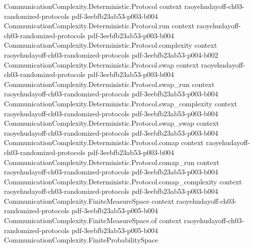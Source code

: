 \begin{theorem}
\label{CommunicationComplexity.Functions.Hash.collision_prob_le}
\leanok
{}
\proofstep
  {CommunicationComplexity.Deterministic.Protocol}
  {context}
  {raoyehudayoff-ch03-randomized-protocols}
  {pdf-3eebfb23ab53-p003-b004}
\proofstep
  {CommunicationComplexity.Deterministic.Protocol.run}
  {context}
  {raoyehudayoff-ch03-randomized-protocols}
  {pdf-3eebfb23ab53-p003-b004}
\proofstep
  {CommunicationComplexity.Deterministic.Protocol.complexity}
  {context}
  {raoyehudayoff-ch03-randomized-protocols}
  {pdf-3eebfb23ab53-p004-b002}
\proofstep
  {CommunicationComplexity.Deterministic.Protocol.swap}
  {context}
  {raoyehudayoff-ch03-randomized-protocols}
  {pdf-3eebfb23ab53-p003-b004}
\proofstep
  {CommunicationComplexity.Deterministic.Protocol.swap_run}
  {context}
  {raoyehudayoff-ch03-randomized-protocols}
  {pdf-3eebfb23ab53-p003-b004}
\proofstep
  {CommunicationComplexity.Deterministic.Protocol.swap_complexity}
  {context}
  {raoyehudayoff-ch03-randomized-protocols}
  {pdf-3eebfb23ab53-p003-b004}
\proofstep
  {CommunicationComplexity.Deterministic.Protocol.swap_swap}
  {context}
  {raoyehudayoff-ch03-randomized-protocols}
  {pdf-3eebfb23ab53-p003-b004}
\proofstep
  {CommunicationComplexity.Deterministic.Protocol.comap}
  {context}
  {raoyehudayoff-ch03-randomized-protocols}
  {pdf-3eebfb23ab53-p003-b004}
\proofstep
  {CommunicationComplexity.Deterministic.Protocol.comap_run}
  {context}
  {raoyehudayoff-ch03-randomized-protocols}
  {pdf-3eebfb23ab53-p003-b004}
\proofstep
  {CommunicationComplexity.Deterministic.Protocol.comap_complexity}
  {context}
  {raoyehudayoff-ch03-randomized-protocols}
  {pdf-3eebfb23ab53-p003-b004}
\proofstep
  {CommunicationComplexity.FiniteMeasureSpace}
  {context}
  {raoyehudayoff-ch03-randomized-protocols}
  {pdf-3eebfb23ab53-p005-b004}
\proofstep
  {CommunicationComplexity.FiniteMeasureSpace.of}
  {context}
  {raoyehudayoff-ch03-randomized-protocols}
  {pdf-3eebfb23ab53-p005-b004}
\proofstep
  {CommunicationComplexity.FiniteProbabilitySpace}

\end{theorem}
